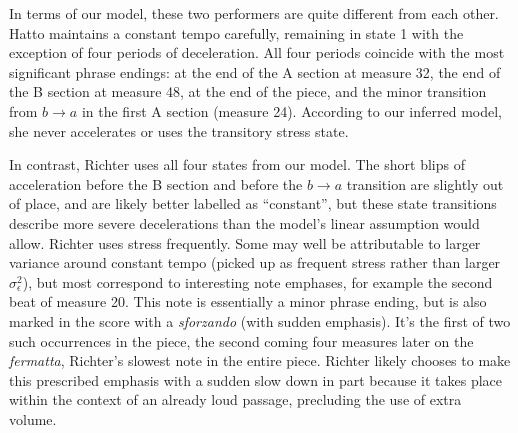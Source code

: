 \documentclass[12pt]{article}
\begin{document}
In terms of our model, these two performers are quite different
from each other. Hatto maintains a constant tempo carefully, remaining
in state 1 with the exception of four periods of deceleration. All
four periods coincide with the most significant phrase endings: at the
end of the A section at measure 32, the end of the B section at
measure 48, at the end of the piece, and the minor transition from
$b\rightarrow a$ in the first A section (measure 24). According
to our inferred model, she never accelerates or uses the transitory
stress state.

In contrast, Richter uses all four states from our model. The short
blips of acceleration before the B section and before the
$b \rightarrow a$ transition are slightly out of place, and are
likely better labelled as ``constant'', but these state transitions
describe more severe decelerations than the model's linear
assumption would allow. Richter uses stress frequently. Some may well be
attributable to larger variance around constant tempo (picked up as
frequent stress rather than larger $\sigma^2_\epsilon$), but most
correspond to interesting note emphases, for example the second beat
of measure 20. This note is essentially a minor phrase ending, but is
also marked in the score with a {\em sforzando} (with sudden
emphasis). It's the first of two such occurrences in the piece, the
second coming four measures later on the {\em fermatta}, Richter's slowest
note in the entire piece. Richter likely chooses to make this
prescribed emphasis with a sudden slow down in part because it takes
place within the context of an already loud passage, precluding the
use of extra volume.
\begin{table}[tb]
  \label{tab:two-perf-parm}
  \caption{The estimated parameters for performances by Richter and
    Hatto.}
\end{table}
\end{document}
